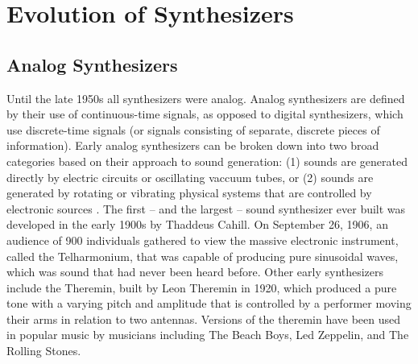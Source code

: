 \section{Evolution of Synthesizers}
\label{section:synth-history}
\subsection{Analog Synthesizers}
Until the late 1950s all synthesizers were analog. Analog synthesizers are defined by their use of continuous-time signals, as opposed to digital synthesizers, which use discrete-time signals (or signals consisting of separate, discrete pieces of information). Early analog synthesizers can be broken down into two broad categories based on their approach to sound generation: (1) sounds are generated directly by electric circuits or oscillating vaccuum tubes, or (2) sounds are generated by rotating or vibrating physical systems that are controlled by electronic sources \cite{roads1996computer}. The first -- and the largest -- sound synthesizer ever built was developed in the early 1900s by Thaddeus Cahill. On September 26, 1906, an audience of 900 individuals gathered to view the massive electronic instrument, called the Telharmonium, that was capable of producing pure sinusoidal waves, which was sound that had never been heard before. Other early synthesizers include the Theremin, built by Leon Theremin in 1920, which produced a pure tone with a varying pitch and amplitude that is controlled by a performer moving their arms in relation to two antennas. Versions of the theremin have been used in popular music by musicians including The Beach Boys, Led Zeppelin, and The Rolling Stones. %

